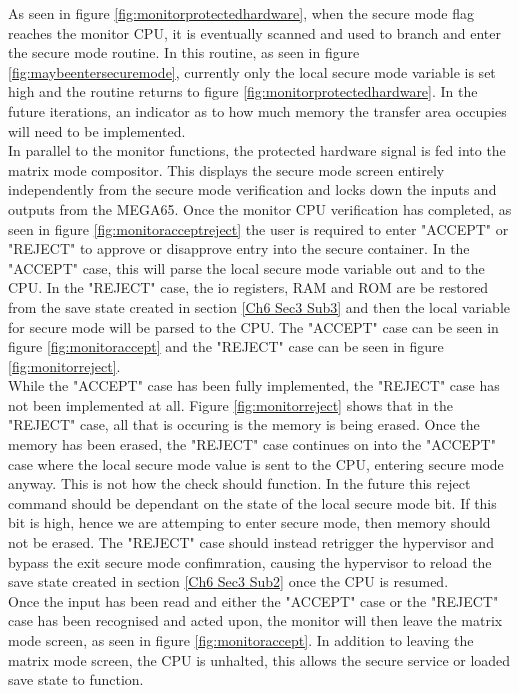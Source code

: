 As seen in figure \ref{fig:monitorprotectedhardware}, when the secure mode flag reaches the monitor CPU, it is eventually scanned and used to branch and enter the secure mode routine. In this routine, as seen in figure \ref{fig:maybeentersecuremode}, currently only the local secure mode variable is set high and the routine returns to figure \ref{fig:monitorprotectedhardware}. In the future iterations, an indicator as to how much memory the transfer area occupies will need to be implemented.\\

In parallel to the monitor functions, the protected hardware signal is fed into the matrix mode compositor. This displays the secure mode screen entirely independently from the secure mode verification and locks down the inputs and outputs from the MEGA65. Once the monitor CPU verification has completed, as seen in figure \ref{fig:monitoracceptreject} the user is required to enter "ACCEPT" or "REJECT" to approve or disapprove entry into the secure container. In the "ACCEPT" case, this will parse the local secure mode variable out and to the CPU. In the "REJECT" case, the io registers, RAM and ROM are be restored from the save state created in section \ref{Ch6 Sec3 Sub3} and then the local variable for secure mode will be parsed to the CPU. The "ACCEPT" case can be seen in figure \ref{fig:monitoraccept} and the "REJECT" case can be seen in figure \ref{fig:monitorreject}.\\

While the "ACCEPT" case has been fully implemented, the "REJECT" case has not been implemented at all. Figure \ref{fig:monitorreject} shows that in the "REJECT" case, all that is occuring is the memory is being erased. Once the memory has been erased, the "REJECT" case continues on into the "ACCEPT" case where the local secure mode value is sent to the CPU, entering secure mode anyway. This is not how the check should function. In the future this reject command should be dependant on the state of the local secure mode bit. If this bit is high, hence we are attemping to enter secure mode, then memory should not be erased. The "REJECT" case should instead retrigger the hypervisor and bypass the exit secure mode confimration, causing the hypervisor to reload the save state created in section \ref{Ch6 Sec3 Sub2} once the CPU is resumed.\\

Once the input has been read and either the "ACCEPT" case or the "REJECT" case has been recognised and acted upon, the monitor will then leave the matrix mode screen, as seen in figure \ref{fig:monitoraccept}. In addition to leaving the matrix mode screen, the CPU is unhalted, this allows the secure service or loaded save state to function.

